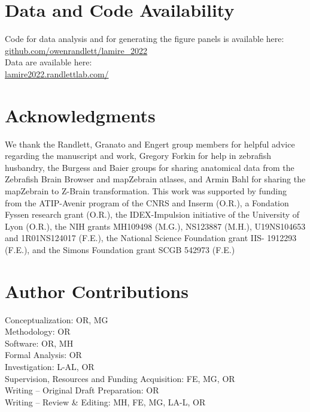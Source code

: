 \documentclass[9pt,lineno]{RandlettLab_elife}
\begin{document}
\section{Data and Code Availability}

Code for data analysis and for generating the figure panels is available here: \\
\href{https://github.com/owenrandlett/lamire_2022}{github.com/owenrandlett/lamire\_2022} \\
Data are available here: \\
\href{http://lamire2022.randlettlab.com/}{lamire2022.randlettlab.com/} 

\section{Acknowledgments}

We thank the Randlett, Granato and Engert group members for helpful advice regarding the manuscript and work, Gregory Forkin for help in zebrafish husbandry, the Burgess and Baier groups for sharing anatomical data from the Zebrafish Brain Browser and mapZebrain atlases, and Armin Bahl for sharing the mapZebrain to Z-Brain transformation. This work was supported by funding from the ATIP-Avenir program of the CNRS and Inserm (O.R.), a Fondation Fyssen research grant (O.R.), the IDEX-Impulsion initiative of the University of Lyon (O.R.), the NIH grants MH109498 (M.G.), NS123887 (M.H.), U19NS104653 and 1R01NS124017 (F.E.), the National Science Foundation grant IIS- 1912293 (F.E.), and the Simons Foundation grant SCGB 542973 (F.E.)


\section{Author Contributions}

Conceptualization: OR, MG \\
Methodology: OR \\
Software: OR, MH \\
Formal Analysis: OR \\ 
Investigation: L-AL, OR \\
Supervision, Resources and Funding Acquisition: FE, MG, OR \\
Writing – Original Draft Preparation: OR \\
Writing – Review \& Editing: MH, FE, MG, LA-L, OR \\


\end{document}
